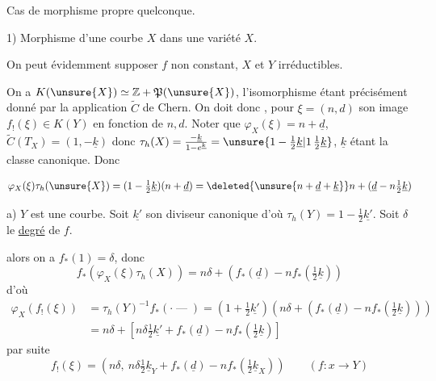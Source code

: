 
Cas de morphisme propre quelconque.

1) Morphisme d'une courbe   \(X\) dans une variété \(X\).

On peut évidemment supposer \(f\) non constant, \(X\) et \(Y\) irréductibles.


On a \(K(\unsure{X})\simeq\mathbb Z+\mathfrak P(\unsure{X})\),  l'isomorphisme étant précisément donné par la application \(\widetilde C\) de Chern. On doit donc , pour \(\xi=(n,d)\) son image \(f_!(\xi)\in K(Y)\) en fonction de \(n,d\). Noter que \(\varphi_X(\xi)=n+\underline d\), \(\widetilde C(T_X)=(1,-\underline k)\) donc \(\tau_h(X)=\frac{-\underline k}{1-e^{\underline k}}=\unsure{1-\tfrac12\underline k|1\,\tfrac12\underline k}\), \(\underline k\) étant la classe canonique. Donc

\[
\varphi_X(\xi)\tau_h(\unsure{X})=(1-\tfrac12\underline k)(n+\underline d)=\deleted{\unsure{n+\underline d+\underline k}}n+(\underline d-n\tfrac12\underline k)
\]

 a) \(Y\) est une courbe. Soit \(\underline{k'}\) son diviseur canonique d'où \(\tau_h(Y)=1-\tfrac12\underline{k'}\). Soit \(\delta\) le \uline{degré} de \(f\).

alors on a \(f_*(1)=\delta\), donc
\[
f_*(\varphi_X(\xi)\tau_h(X))=n\delta+\left(f_*(\underline d)-nf_*(\tfrac12\underline k)\right)
\]
d'où
\[
\begin{aligned}
\varphi_X(f_!(\xi))&=\tau_h(Y)^{-1}f_*(\mathord{\cdot}\mathbin{\text{---}})=(1+\tfrac12\underline{k'})(n\delta+(f_*(\underline d)-nf_*(\tfrac12\underline k)))\\
&=n\delta+\left[n\delta\tfrac12\underline{k'}+f_*(\underline d)-nf_*(\tfrac12\underline k)\right]
\end{aligned}
\]
par suite
\[
\boxed{f_!(\xi)=\left(n\delta,\ n\delta\tfrac12\underline{k}_Y+f_*(\underline d)-nf_*(\tfrac12\underline{k}_X)\right)}\qquad(f:x\longrightarrow Y)
\]


